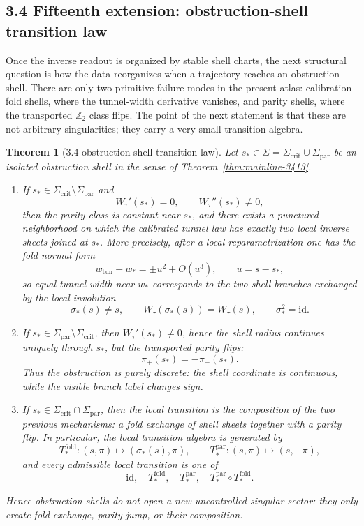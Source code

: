\documentclass[12pt,a4paper]{article}
\newtheorem{theorem}{Theorem}[section]
\begin{document}
\subsection*{3.4 Fifteenth extension: obstruction-shell transition law}
Once the inverse readout is organized by stable shell charts, the next structural question is how the data reorganizes when a trajectory reaches an obstruction shell. There are only two primitive failure modes in the present atlas: calibration-fold shells, where the tunnel-width derivative vanishes, and parity shells, where the transported $\mathbb Z_2$ class flips. The point of the next statement is that these are not arbitrary singularities; they carry a very small transition algebra.

\begin{theorem}[3.4 obstruction-shell transition law]
\label{thm:mainline-3414}
Let $s_\ast\in \Sigma=\Sigma_{\mathrm{crit}}\cup\Sigma_{\mathrm{par}}$ be an isolated obstruction shell in the sense of Theorem~\ref{thm:mainline-3413}.
\begin{enumerate}[label=(\roman*)]
 \item If $s_\ast\in \Sigma_{\mathrm{crit}}\setminus\Sigma_{\mathrm{par}}$ and
 \[
 W_\tau'(s_\ast)=0,
 \qquad
 W_\tau''(s_\ast)\neq 0,
 \]
 then the parity class is constant near $s_\ast$, and there exists a punctured neighborhood on which the calibrated tunnel law has exactly two local inverse sheets joined at $s_\ast$. More precisely, after a local reparametrization one has the fold normal form
 \[
 w_{\mathrm{tun}}-w_\ast = \pm u^2 + O(u^3),
 \qquad
 u=s-s_\ast,
 \]
 so equal tunnel width near $w_\ast$ corresponds to the two shell branches exchanged by the local involution
 \[
 \sigma_\ast(s)\neq s,
 \qquad
 W_\tau(\sigma_\ast(s))=W_\tau(s),
 \qquad
 \sigma_\ast^2=\mathrm{id}.
 \]

 \item If $s_\ast\in \Sigma_{\mathrm{par}}\setminus\Sigma_{\mathrm{crit}}$, then $W_\tau'(s_\ast)\neq 0$, hence the shell radius continues uniquely through $s_\ast$, but the transported parity flips:
 \[
 \pi_+(s_\ast)=-\pi_-(s_\ast).
 \]
 Thus the obstruction is purely discrete: the shell coordinate is continuous, while the visible branch label changes sign.

 \item If $s_\ast\in \Sigma_{\mathrm{crit}}\cap\Sigma_{\mathrm{par}}$, then the local transition is the composition of the two previous mechanisms: a fold exchange of shell sheets together with a parity flip. In particular, the local transition algebra is generated by
 \[
 T_\ast^{\mathrm{fold}}:(s,\pi)\mapsto (\sigma_\ast(s),\pi),
 \qquad
 T_\ast^{\mathrm{par}}:(s,\pi)\mapsto (s,-\pi),
 \]
 and every admissible local transition is one of
 \[
 \mathrm{id},
 \quad
 T_\ast^{\mathrm{fold}},
 \quad
 T_\ast^{\mathrm{par}},
 \quad
 T_\ast^{\mathrm{par}}\circ T_\ast^{\mathrm{fold}}.
 \]
\end{enumerate}
Hence obstruction shells do not open a new uncontrolled singular sector: they only create fold exchange, parity jump, or their composition.
\end{theorem}
\end{document}
